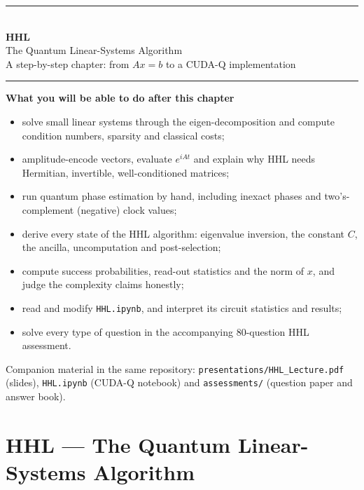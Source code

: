 \documentclass[11pt,a4paper,openany]{book}
\begin{document}
\begin{titlepage}
\centering
{\color{brand}\rule{\linewidth}{1.5pt}}\\[10pt]
{\Huge\bfseries\color{brand} HHL}\\[8pt]
{\LARGE The Quantum Linear-Systems Algorithm}\\[6pt]
{\large A step-by-step chapter: from $Ax = b$ to a CUDA-Q implementation}\\[6pt]
{\color{brand}\rule{\linewidth}{1.5pt}}
\vspace{18mm}

\begin{minipage}{0.86\linewidth}
\large
\textbf{What you will be able to do after this chapter}
\begin{itemize}[itemsep=3pt]
\item solve small linear systems through the eigen-decomposition and compute condition numbers, sparsity and classical costs;
\item amplitude-encode vectors, evaluate $e^{iAt}$ and explain why HHL needs Hermitian, invertible, well-conditioned matrices;
\item run quantum phase estimation by hand, including inexact phases and two's-complement (negative) clock values;
\item derive every state of the HHL algorithm: eigenvalue inversion, the constant $C$, the ancilla, uncomputation and post-selection;
\item compute success probabilities, read-out statistics and the norm of $x$, and judge the complexity claims honestly;
\item read and modify \texttt{HHL.ipynb}, and interpret its circuit statistics and results;
\item solve every type of question in the accompanying 80-question HHL assessment.
\end{itemize}
\end{minipage}
\vfill
{\small Companion material in the same repository: \texttt{presentations/HHL\_Lecture.pdf} (slides),
\texttt{HHL.ipynb} (CUDA-Q notebook) and \texttt{assessments/} (question paper and answer book).}
\end{titlepage}

\tableofcontents
\setcounter{chapter}{0}
\chapter*{HHL --- The Quantum Linear-Systems Algorithm}
\end{document}
